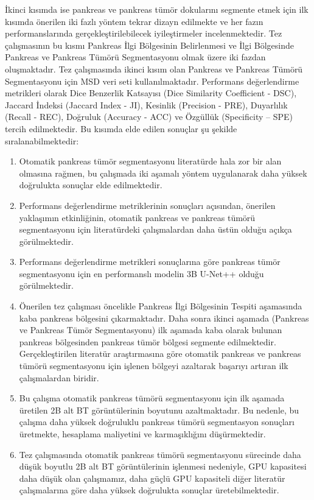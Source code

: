 İkinci kısımda ise pankreas ve pankreas tümör dokularını segmente etmek için ilk kısımda önerilen iki fazlı yöntem tekrar dizayn edilmekte ve her fazın performanslarında gerçekleştirilebilecek iyileştirmeler incelenmektedir. Tez çalışmasının bu kısmı Pankreas İlgi Bölgesinin Belirlenmesi ve İlgi Bölgesinde Pankreas ve Pankreas Tümörü Segmentasyonu olmak üzere iki fazdan oluşmaktadır. Tez çalışmasında ikinci kısım olan Pankreas ve Pankreas Tümörü Segmentasyonu için MSD veri seti kullanılmaktadır. Performans değerlendirme metrikleri olarak Dice Benzerlik Katsayısı (Dice Similarity Coefficient - DSC), Jaccard İndeksi (Jaccard Index - JI), Kesinlik (Precision - PRE), Duyarlılık (Recall - REC), Doğruluk (Accuracy - ACC) ve Özgüllük (Specificity – SPE) tercih edilmektedir. Bu kısımda elde edilen sonuçlar şu şekilde sıralanabilmektedir:

\begin{enumerate}

    \item Otomatik pankreas tümör segmentasyonu literatürde hala zor bir alan olmasına rağmen, bu çalışmada iki aşamalı yöntem uygulanarak daha yüksek doğrulukta sonuçlar elde edilmektedir.
    
    \item Performans değerlendirme metriklerinin sonuçları açısından, önerilen yaklaşımın etkinliğinin, otomatik pankreas ve pankreas tümörü segmentasyonu için literatürdeki çalışmalardan daha üstün olduğu açıkça görülmektedir.
    
    \item Performans değerlendirme metrikleri sonuçlarına göre pankreas tümör segmentasyonu için en performanslı modelin 3B U-Net++ olduğu görülmektedir.
    
    \item Önerilen tez çalışması öncelikle Pankreas İlgi Bölgesinin Tespiti aşamasında kaba pankreas bölgesini çıkarmaktadır. Daha sonra ikinci aşamada (Pankreas ve Pankreas Tümör Segmentasyonu) ilk aşamada kaba olarak bulunan pankreas bölgesinden pankreas tümör bölgesi segmente edilmektedir. Gerçekleştirilen literatür araştırmasına göre otomatik pankreas ve pankreas tümörü segmentasyonu için işlenen bölgeyi azaltarak başarıyı artıran ilk çalışmalardan biridir. 
    
    \item Bu çalışma otomatik pankreas tümörü segmentasyonu için ilk aşamada üretilen 2B alt BT görüntülerinin boyutunu azaltmaktadır. Bu nedenle, bu çalışma daha yüksek doğruluklu pankreas tümörü segmentasyon sonuçları üretmekte, hesaplama maliyetini ve karmaşıklığını düşürmektedir.
    
    \item Tez çalışmasında otomatik pankreas tümörü segmentasyonu sürecinde daha düşük boyutlu 2B alt BT görüntülerinin işlenmesi nedeniyle, GPU kapasitesi daha düşük olan çalışmamız, daha güçlü GPU kapasiteli diğer literatür çalışmalarına göre daha yüksek doğrulukta sonuçlar üretebilmektedir. 

\end{enumerate}